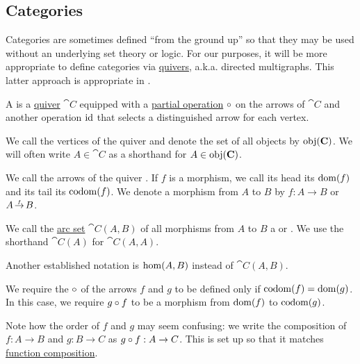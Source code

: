 \subsection{Categories}\label{subsec:categories}

Categories are sometimes defined \enquote{from the ground up} so that they may be used without an underlying set theory or logic. For our purposes, it will be more appropriate to define categories via \hyperref[def:quiver]{quivers}, a.k.a. directed multigraphs. This latter approach is appropriate in \hyperref[def:axiom_of_universes]{}.

\begin{definition}\label{def:category}
  A  is a \hyperref[def:quiver]{quiver} \( \cat{C} \) equipped with a \hyperref[def:partial_function]{partial operation} \( \mathbin \circ \) on the arrows of \( \cat{C} \) and another operation \( \operatorname{id} \) that selects a distinguished arrow for each vertex.

  \begin{thmenum}[series=def:category]
     We call the vertices of the quiver  and denote the set of all objects by \( \operatorname{obj}(\operatorname{\mathbf{C}}) \). We will often write \( A \in \cat{C} \) as a shorthand for \( A \in \operatorname{obj}(\operatorname{\mathbf{C}}) \).

     We call the arrows of the quiver . If \( f \) is a morphism, we call its head its  \( \operatorname{dom}(f) \) and its tail its  \( \operatorname*{co\negthinspace\operatorname{dom}}(f) \). We denote a morphism from \( A \) to \( B \) by \( f: A \to B \) or \( A \reloset f \to B \).

    We call the \hyperref[eq:def:quiver/arc_set]{arc set} \( \cat{C}(A, B) \) of all morphisms from \( A \) to \( B \) a  or . We use the shorthand \( \cat{C}(A) \) for \( \cat{C}(A, A) \).

    Another established notation is \( \operatorname{hom}(A, B) \) instead of \( \cat{C}(A, B) \).

     We require the  \( \mathbin \circ \) of the arrows \( f \) and \( g \) to be defined only if \( \operatorname*{co\negthinspace\operatorname{dom}}(f) = \operatorname{dom}(g) \). In this case, we require \( g \mathbin \circ f \) to be a morphism from \( \operatorname{dom}(f) \) to \( \operatorname*{co\negthinspace\operatorname{dom}}(g) \).

    Note how the order of \( f \) and \( g \) may seem confusing: we write the composition of \( f: A \to B \) and \( g: B \to C \) as \( g \mathbin \circ f: A \to C \). This is set up so that it matches \hyperref[def:multi_valued_function/composition]{function composition}.


\end{thmenum}
\end{definition}
